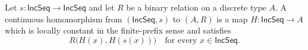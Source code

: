 \begin{definition}
Let $s:\mathsf{IncSeq}\to\mathsf{IncSeq}$ and let $R$ be a binary
relation on a discrete type $A$.  A continuous homomorphism from
$(\mathsf{IncSeq},s)$ to $(A,R)$ is a map $H:\mathsf{IncSeq}\to A$ which is
locally constant in the finite-prefix sense and satisfies
\[
R\bigl(H(x),H(s(x))\bigr)
\quad\text{for every }x\in\mathsf{IncSeq}.
\]
\end{definition}
